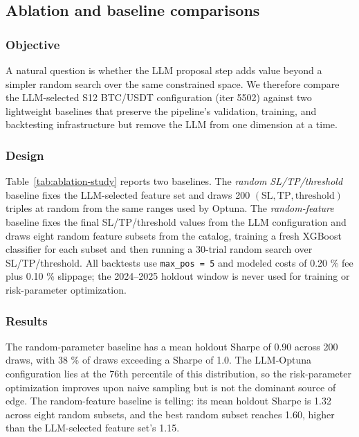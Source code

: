 \documentclass[analytics,article,submit,pdftex,moreauthors]{Definitions/mdpi}
\begin{document}
\subsection{Ablation and baseline comparisons}\label{ablation-and-baseline-comparisons}

\subsubsection{Objective}

A natural question is whether the LLM proposal step adds value beyond a simpler random search over the same constrained space. We therefore compare the LLM-selected S12 BTC/USDT configuration (iter 5502) against two lightweight baselines that preserve the pipeline's validation, training, and backtesting infrastructure but remove the LLM from one dimension at a time.

\subsubsection{Design}

Table~\ref{tab:ablation-study} reports two baselines. The \emph{random SL/TP/threshold} baseline fixes the LLM-selected feature set and draws 200 \((\mathrm{SL}, \mathrm{TP}, \mathrm{threshold})\) triples at random from the same ranges used by Optuna. The \emph{random-feature} baseline fixes the final SL/TP/threshold values from the LLM configuration and draws eight random feature subsets from the catalog, training a fresh XGBoost classifier for each subset and then running a 30-trial random search over SL/TP/threshold. All backtests use \texttt{max\_pos\ =\ 5} and modeled costs of 0.20 \% fee plus 0.10 \% slippage; the 2024--2025 holdout window is never used for training or risk-parameter optimization.

\subsubsection{Results}

The random-parameter baseline has a mean holdout Sharpe of 0.90 across 200 draws, with 38 \% of draws exceeding a Sharpe of 1.0. The LLM-Optuna configuration lies at the 76th percentile of this distribution, so the risk-parameter optimization improves upon naive sampling but is not the dominant source of edge. The random-feature baseline is telling: its mean holdout Sharpe is 1.32 across eight random subsets, and the best random subset reaches 1.60, higher than the LLM-selected feature set's 1.15.
\end{document}
